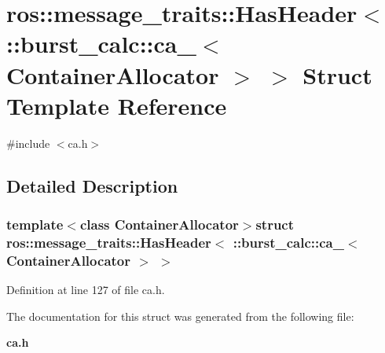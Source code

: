 \section{ros\-:\-:message\-\_\-traits\-:\-:\-Has\-Header$<$ \-:\-:burst\-\_\-calc\-:\-:ca\-\_\-$<$ \-Container\-Allocator $>$ $>$ \-Struct \-Template \-Reference}
\label{structros_1_1message__traits_1_1HasHeader_3_01_1_1burst__calc_1_1ca___3_01ContainerAllocator_01_4_01_4}


{\ttfamily \#include $<$ca.\-h$>$}



\subsection{\-Detailed \-Description}
\subsubsection*{template$<$class Container\-Allocator$>$struct ros\-::message\-\_\-traits\-::\-Has\-Header$<$ \-::burst\-\_\-calc\-::ca\-\_\-$<$ Container\-Allocator $>$ $>$}



\-Definition at line 127 of file ca.\-h.



\-The documentation for this struct was generated from the following file\-:\begin{DoxyCompactItemize}
\item 
{\bf ca.\-h}\end{DoxyCompactItemize}
